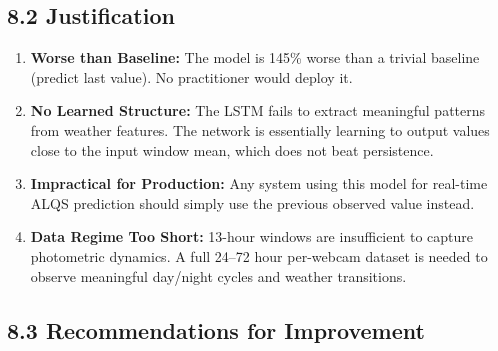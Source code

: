 \documentclass[11pt,a4paper]{article}
\begin{document}
\subsection{8.2 Justification}

\begin{enumerate}
    \item \textbf{Worse than Baseline:} The model is 145\% worse than a trivial baseline (predict last value). No practitioner would deploy it.
    
    \item \textbf{No Learned Structure:} The LSTM fails to extract meaningful patterns from weather features. The network is essentially learning to output values close to the input window mean, which does not beat persistence.
    
    \item \textbf{Impractical for Production:} Any system using this model for real-time ALQS prediction should simply use the previous observed value instead.
    
    \item \textbf{Data Regime Too Short:} 13-hour windows are insufficient to capture photometric dynamics. A full 24--72 hour per-webcam dataset is needed to observe meaningful day/night cycles and weather transitions.
\end{enumerate}

\subsection{8.3 Recommendations for Improvement}
\end{document}
